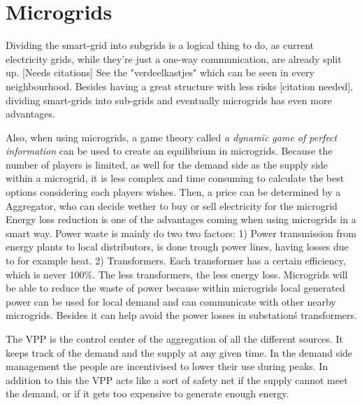 \section{Microgrids }
Dividing the smart-grid into subgrids is a logical thing to do, as current electricity grids, while they're just a one-way communication, are already split up. [Needs citations] See the "verdeelkastjes" which can be seen in every neighbourhood. Besides having a great structure with less risks [citation needed], dividing smart-grids into sub-grids and eventually microgrids  has even more advantages. 

Also, when using microgrids, a game theory called \emph{a dynamic game of perfect information}  can be used to create an equilibrium in microgrids. Because the number of players is limited, as well for the demand side as the supply side within a microgrid, it is less complex and time consuming to calculate the best options considering each players wishes. Then, a price can be determined by a Aggregator, who can decide wether to buy or sell electricity for the microgrid \cite{MicrogridModellingPetrosAristidou}\linebreak \indent
Energy loss reduction is one of the advantages coming when using microgrids in a smart way. Power waste is mainly do two two factors\cite{EnergyLossURL}: 1) Power transmission from energy plants to local distributors, is done trough power lines, having losses due to for example heat. 2) Transformers. Each transformer has a certain efficiency, which is never 100\%. The less transformers, the less energy loss.\linebreak \indent
Microgrids will be able to reduce the waste of power because within microgrids local generated power can be used for local demand and can communicate with other nearby microgrids. Besides it can help avoid the power losses in substation\'s transformers\cite{keypaper}.


The VPP is the control center of the aggregation of all the different sources. It keeps track of the demand and the supply at any given time. In the demand side management the people are incentivised to lower their use during peaks. In addition to this the VPP acts like a sort of safety net if the supply cannot meet the demand, or if it gets too expensive to generate enough energy. \cite{Kumagai2012}

